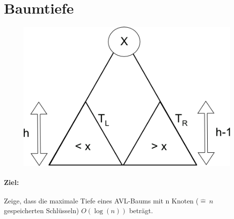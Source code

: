 \pagebreak
\section{Baumtiefe} %
\begin{figure}
	\vspace{-50pt}
\includegraphics[width=\linewidth]{11/Grafik/img1.png}
\caption{}
\end{figure}

\vspace{30pt}
\paragraph{Ziel:}%
Zeige, dass die maximale Tiefe eines AVL-Baums mit n Knoten ($\hat{=}~ n$ gespeicherten Schlüsseln) $O(\log(n))$ beträgt.
\vspace{50pt}
